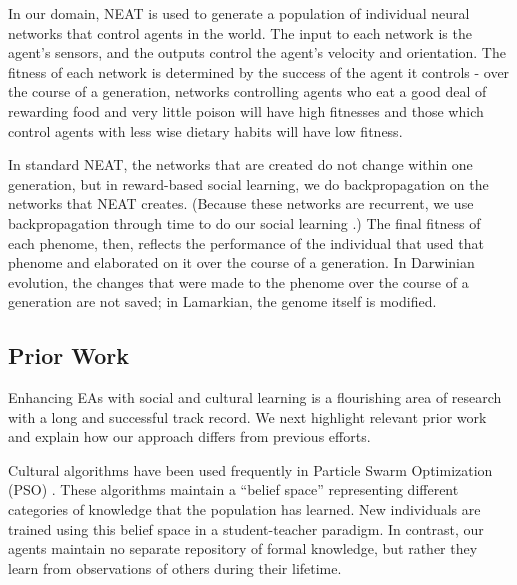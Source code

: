 \documentclass{acm_proc_article-sp}
\begin{document}
In our domain, NEAT is used to generate a population of individual neural networks that control agents in the world. The input to each network is the agent's sensors, and the outputs control the agent's velocity and orientation. The fitness of each network is determined by the success of the agent it controls - over the course of a generation, networks controlling agents who eat a good deal of rewarding food and very little poison will have high fitnesses and those which control agents with less wise dietary habits will have low fitness.

In standard NEAT, the networks that are created do not change within one generation, but in reward-based social learning, we do backpropagation\cite{rumelhart1986learning} on the networks that NEAT creates. (Because these networks are recurrent, we use backpropagation through time to do our social learning \cite{werbos1990backpropagation}.) The final fitness of each phenome, then, reflects the performance of the individual that used that phenome and elaborated on it over the course of a generation. In Darwinian evolution, the changes that were made to the phenome over the course of a generation are not saved; in Lamarkian, the genome itself is modified.

\subsection*{Prior Work}

Enhancing EAs with social and cultural learning is a flourishing area of research with a long and successful track record. We next highlight relevant prior work and explain how our approach differs from previous efforts.

Cultural algorithms \cite{reynolds1994introduction} have been used frequently in Particle Swarm Optimization (PSO) \cite{kennedy1995particle}. These algorithms maintain a ``belief space'' representing different categories of knowledge that the population has learned. New individuals are trained using this belief space in a student-teacher paradigm. In contrast, our agents maintain no separate repository of formal knowledge, but rather they learn from observations of others during their lifetime.
\end{document}
